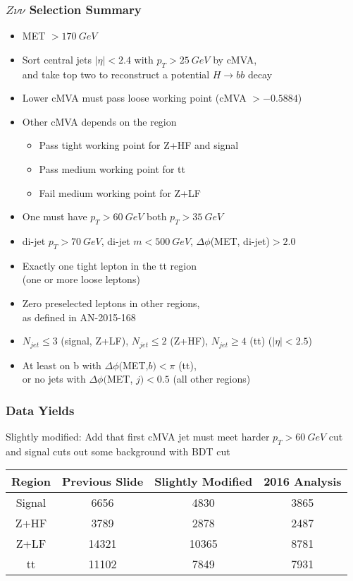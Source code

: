 \documentclass{beamer}
\begin{document}
\begin{frame}
  \frametitle{$Z\nu\nu$ Selection Summary}
  \begin{itemize}
  \item MET $> \SI{170}{GeV}$
  \item Sort central jets $|\eta| < 2.4$ with $p_T > \SI{25}{GeV}$ by cMVA, \\
    and take top two to reconstruct a potential $H \rightarrow bb$ decay
  \item Lower cMVA must pass loose working point (cMVA $> -0.5884$)
  \item Other cMVA depends on the region
    \begin{itemize}
    \item Pass tight working point for Z+HF and signal
    \item Pass medium working point for tt
    \item Fail medium working point for Z+LF
    \end{itemize}
  \item One must have $p_T > \SI{60}{GeV}$ both $p_T > \SI{35}{GeV}$
  \item di-jet $p_T > \SI{70}{GeV}$, di-jet $m < \SI{500}{GeV}$, $\Delta \phi$(MET, di-jet)$ > 2.0$
  \item Exactly one tight lepton in the tt region \\ (one or more loose leptons)
  \item Zero preselected leptons in other regions, \\
    as defined in AN-2015-168
  \item $N_{jet} \le 3$ (signal, Z+LF), $N_{jet} \le 2$ (Z+HF), $N_{jet} \ge 4$ (tt) ($|\eta| < 2.5$)
  \item At least on b with $\Delta \phi($MET,$b) < \pi$ (tt), \\
    or no jets with $\Delta \phi($MET, $j) < 0.5$ (all other regions)
  \end{itemize}
\end{frame}

\begin{frame}
  \frametitle{Data Yields}
  Slightly modified: Add that first cMVA jet must meet harder $p_T > \SI{60}{GeV}$ cut
  and signal cuts out some background with BDT cut

  \hspace{24pt}

  \begin{tabular}{c c c c}
    Region & Previous Slide & Slightly Modified & 2016 Analysis \\
    \hline
    Signal & 6656           & 4830              & 3865          \\
    Z+HF   & 3789           & 2878              & 2487          \\
    Z+LF   & 14321          & 10365             & 8781          \\
    tt     & 11102          & 7849              & 7931
  \end{tabular}

\end{frame}
\end{document}
